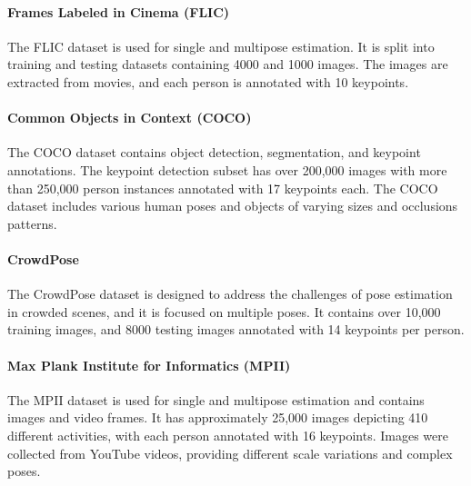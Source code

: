 \paragraph{Frames Labeled in Cinema (FLIC)}
The FLIC dataset \cite{sapp2013modec} is used for single and multipose estimation. It is split into training and testing datasets containing 4000 and 1000 images. The images are extracted 
from movies, and each person is annotated with 10 keypoints.

\paragraph{Common Objects in Context (COCO)}
The COCO dataset \cite{lin2014microsoft} contains object detection, segmentation, and keypoint annotations. The keypoint detection subset has over 200,000 images with more than 250,000 person
 instances annotated with 17 keypoints each. The COCO dataset includes various human poses and objects of varying sizes and occlusions patterns.

\paragraph{CrowdPose}
The CrowdPose dataset \cite{li2019crowdpose} is designed to address the challenges of pose estimation in crowded scenes, and it is focused on multiple poses. It contains over 10,000 training
images, and 8000 testing images annotated with 14 keypoints per person.

\paragraph{Max Plank Institute for Informatics (MPII)}
The MPII dataset \cite{andriluka20142d} is used for single and multipose estimation and contains images and video frames. It has approximately 25,000 images depicting 410 different activities,
with each person annotated with 16 keypoints. Images were collected from YouTube videos, providing different scale variations and complex poses.

